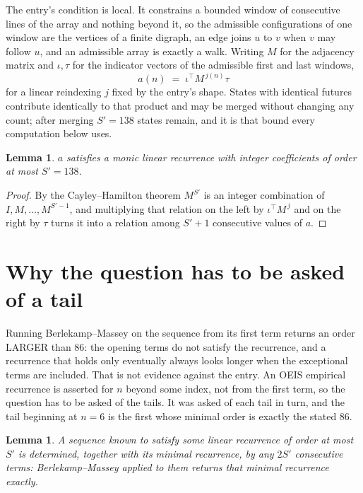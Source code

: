 \documentclass[11pt,a4paper]{article}
\theoremstyle{plain}
\newtheorem{lemma}[theorem]{Lemma}
\theoremstyle{definition}
\begin{document}
The entry's condition is local. It constrains a bounded window of consecutive lines of the
array and nothing beyond it, so the admissible configurations of one window are the vertices of
a finite digraph, an edge joins $u$ to $v$ when $v$ may follow $u$, and an admissible array is
exactly a walk. Writing $M$ for the adjacency matrix and $\iota,\tau$ for the indicator vectors
of the admissible first and last windows,
\[
a(n)\;=\;\iota^{\!\top}M^{\,j(n)}\tau
\]
for a linear reindexing $j$ fixed by the entry's shape. States with identical futures
contribute identically to that product and may be merged without changing any count; after
merging $S'=138$ states remain, and it is that bound every computation below uses.

\begin{lemma}\label{lem:cf}
$a$ satisfies a monic linear recurrence with integer coefficients of order at most $S'=138$.
\end{lemma}

\begin{proof}
By the Cayley--Hamilton theorem $M^{S'}$ is an integer combination of $I,M,\dots,M^{S'-1}$,
and multiplying that relation on the left by $\iota^{\!\top}M^{\,j}$ and on the right by
$\tau$ turns it into a relation among $S'+1$ consecutive values of $a$.
\end{proof}

\section{Why the question has to be asked of a tail}

Running Berlekamp--Massey on the sequence from its first term returns an order LARGER than $86$: the opening terms do not satisfy the recurrence, and a recurrence that holds only eventually always looks longer when the exceptional terms are included. That is not evidence against the entry. An OEIS empirical recurrence is asserted for $n$ beyond some index, not from the first term, so the question has to be asked of the tails. It was asked of each tail in turn, and the tail beginning at $n=6$ is the first whose minimal order is exactly the stated $86$.

\begin{lemma}\label{lem:bm}
A sequence known to satisfy some linear recurrence of order at most $S'$ is determined,
together with its minimal recurrence, by any $2S'$ consecutive terms: Berlekamp--Massey applied
to them returns that minimal recurrence exactly.
\end{lemma}
\end{document}
